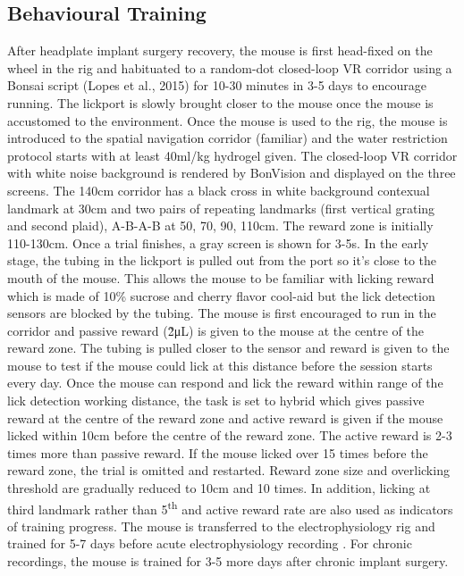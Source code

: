 \subsection{Behavioural Training}
After headplate implant surgery recovery, the mouse is first head-fixed on the wheel in the rig and habituated to a random-dot closed-loop VR corridor using a Bonsai script (Lopes et al., 2015) for 10-30 minutes in 3-5 days to encourage running. The lickport is slowly brought closer to the mouse once the mouse is accustomed to the environment. Once the mouse is used to the rig, the mouse is introduced to the spatial navigation corridor (familiar) and the water restriction protocol starts with at least 40ml/kg hydrogel given. The closed-loop VR corridor with white noise background is rendered by BonVision and displayed on the three screens. The 140cm corridor has a black cross in white background contexual landmark at 30cm and two pairs of repeating landmarks (first vertical grating and second plaid), A-B-A-B at 50, 70, 90, 110cm. The reward zone is initially 110-130cm. Once a trial finishes, a gray screen is shown for 3-5s. In the early stage, the tubing in the lickport is pulled out from the port so it’s close to the mouth of the mouse. This allows the mouse to be familiar with licking reward which is made of 10\% sucrose and cherry flavor cool-aid but the lick detection sensors are blocked by the tubing. The mouse is first encouraged to run in the corridor and passive reward (\~2μL) is given to the mouse at the centre of the reward zone. The tubing is pulled closer to the sensor and reward is given to the mouse to test if the mouse could lick at this distance before the session starts every day. Once the mouse can respond and lick the reward within range of the lick detection working distance, the task is set to hybrid which gives passive reward at the centre of the reward zone and active reward is given if the mouse licked within 10cm before the centre of the reward zone. The active reward is 2-3 times more than passive reward. If the mouse licked over 15 times before the reward zone, the trial is omitted and restarted. Reward zone size and overlicking threshold are gradually reduced to 10cm and 10 times. In addition, licking at third landmark rather than 5\textsuperscript{th} and active reward rate are also used as indicators of training progress. The mouse is transferred to the electrophysiology rig and trained for 5-7 days before acute electrophysiology recording . For chronic recordings, the mouse is trained for 3-5 more days after chronic implant surgery.


